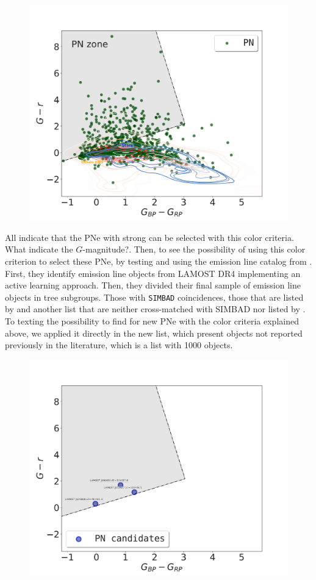\documentclass[fleqn,usenatbib]{mnras}
\begin{document}
\begin{figure}
\centering
\includegraphics[width=0.9\linewidth]{Figs/color-diagram-ps-gaiaEDR3.pdf}
  \caption{} 
  \label{fig:gaia-ps}
\end{figure}

All indicate that the PNe with strong \ha{} can be selected with this color
criteria. {\sc What indicate the $G$-magnitude?.}
Then, to see the possibility of using this color criterion to select these PNe, by
testing and using the emission line catalog from \citet{Skoda:2020}. First, they
identify emission line objects from LAMOST DR4 implementing an active learning approach.
Then, they divided their final sample of emission line objects in tree subgroups.
Those with \texttt{SIMBAD} coincidences, those that are listed by \citet{Hou:2016}
and another list that are neither cross-matched with
SIMBAD nor listed by \citet{Hou:2016}. To texting the possibility to find
for new PNe with the color criteria explained above, we applied it directly in the new list,
which present objects not reported previously in the literature, which is a list with
1000 objects.

\begin{figure}
\centering
  \includegraphics[width=0.9\linewidth]{Figs/pn-candidates-gaiaDR3.pdf}
  \caption{} 
  \label{fig:gaia-ps-apply}
\end{figure}
\end{document}
